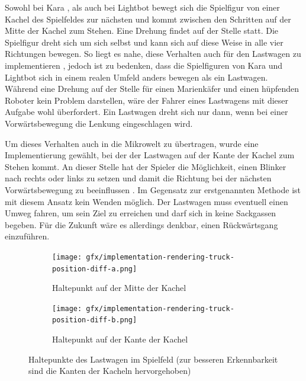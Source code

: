 Sowohl bei Kara , als auch bei Lightbot  bewegt sich die Spielfigur von einer Kachel des Spielfeldes zur nächsten und kommt zwischen den Schritten auf der Mitte der Kachel zum Stehen. Eine Drehung findet auf der Stelle statt. Die Spielfigur dreht sich um sich selbst und kann sich auf diese Weise in alle vier Richtungen bewegen. So liegt es nahe, diese Verhalten auch für den Lastwagen zu implementieren , jedoch ist zu bedenken, dass die Spielfiguren von Kara und Lightbot sich in einem realen Umfeld anders bewegen als ein Lastwagen. Während eine Drehung auf der Stelle für einen Marienkäfer und einen hüpfenden Roboter kein Problem darstellen, wäre der Fahrer eines Lastwagens mit dieser Aufgabe wohl überfordert. Ein Lastwagen dreht sich nur dann, wenn bei einer Vorwärtsbewegung die Lenkung eingeschlagen wird.

Um dieses Verhalten auch in die Mikrowelt zu übertragen, wurde eine Implementierung gewählt, bei der der Lastwagen auf der Kante der Kachel zum Stehen kommt. An dieser Stelle hat der Spieler die Möglichkeit, einen Blinker nach rechts oder links zu setzen und damit die Richtung bei der nächsten Vorwärtsbewegung zu beeinflussen . Im Gegensatz zur erstgenannten Methode ist mit diesem Ansatz kein Wenden möglich. Der Lastwagen muss eventuell einen Umweg fahren, um sein Ziel zu erreichen und darf sich in keine Sackgassen begeben. Für die Zukunft wäre es allerdings denkbar, einen Rückwärtsgang einzuführen.

\begin{figure}
  \begin{subfigure}[b]{0.45\textwidth}
    \texttt{[image: gfx/implementation-rendering-truck-position-diff-a.png]}
    \caption{Haltepunkt auf der Mitte der Kachel}
    \label{fig:implementation:rendering:truck-position:diff:a}
  \end{subfigure}\hfill
  \begin{subfigure}[b]{0.45\textwidth}
    \texttt{[image: gfx/implementation-rendering-truck-position-diff-b.png]}
    \caption{Haltepunkt auf der Kante der Kachel}
    \label{fig:implementation:rendering:truck-position:diff:b}
  \end{subfigure}\hfill
  \caption{Haltepunkte des Lastwagen im Spielfeld (zur besseren Erkennbarkeit sind die Kanten der Kacheln hervorgehoben)}
  \label{fig:implementation:rendering:truck-position:diff}
\end{figure}

